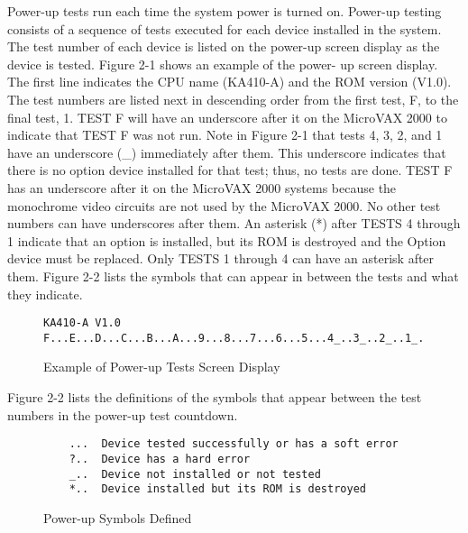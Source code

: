 Power-up tests run each time the system power is turned on. Power-up
testing consists of a sequence of tests executed for each device installed in
the system. The test number of each device is listed on the power-up screen
display as the device is tested. Figure 2-1 shows an example of the power-
up screen display. The first line indicates the CPU name (KA410-A) and the
ROM version (V1.0). The test numbers are listed next in descending order
from the first test, F, to the final test, 1. TEST F will have an underscore
after it on the MicroVAX 2000 to indicate that TEST F was not run. Note in
Figure 2-1 that tests 4, 3, 2, and 1 have an underscore (\_) immediately after
them. This underscore indicates that there is no option device installed for
that test; thus, no tests are done. TEST F has an underscore after it on the
MicroVAX 2000 systems because the monochrome video circuits are not
used by the MicroVAX 2000. No other test numbers can have underscores
after them. An asterisk (*) after TESTS 4 through 1 indicate that an option is
installed, but its ROM is destroyed and the Option device must be replaced.
Only TESTS 1 through 4 can have an asterisk after them. Figure 2-2 lists
the symbols that can appear in between the tests and what they indicate.

\begin{figure}[H]
\caption{Example of Power-up Tests Screen Display}
\begin{verbatim}
KA410-A V1.0
F...E...D...C...B...A...9...8...7...6...5...4_..3_..2_..1_..
\end{verbatim}
\end{figure}

Figure 2-2 lists the definitions of the symbols that appear between the test
numbers in the power-up test countdown.

\begin{figure}[H]
\caption{Power-up Symbols Defined}
\begin{verbatim}
    ...  Device tested successfully or has a soft error
    ?..  Device has a hard error
    _..  Device not installed or not tested
    *..  Device installed but its ROM is destroyed
\end{verbatim}
\end{figure}
\label{figure:2-1}

